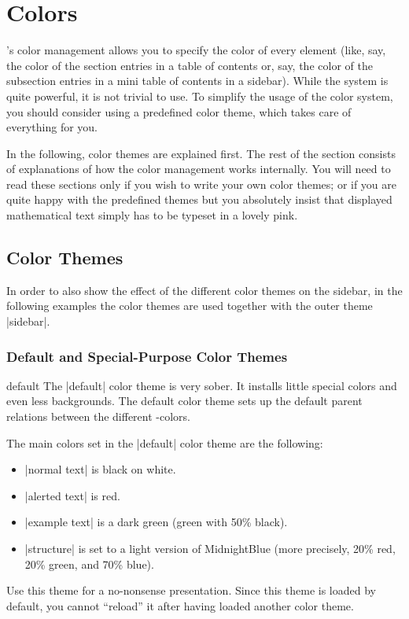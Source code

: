 %

\section{Colors}

\label{section-colors}

\beamer's color management allows you to specify the color of every
element (like, say, the color of the section entries in a table of
contents or, say, the color of the subsection entries in a mini table
of contents in a sidebar). While the system is quite powerful, it is
not trivial to use. To simplify the usage of the color system, you
should consider using a predefined color theme, which takes care of
everything for you.

In the following, color themes are explained first. The rest of the
section consists of explanations of how the color management works
internally. You will need to read these sections only if you wish to
write your own color themes; or if you are quite happy with the
predefined themes but you absolutely insist that displayed
mathematical text simply has to be typeset in a lovely pink.



\subsection{Color Themes}

In order to also show the effect of the different color themes on the
sidebar, in the following examples the color themes are used together
with the outer theme |sidebar|.

\subsubsection{Default and Special-Purpose Color Themes}

\begin{colorthemeexample}{default}
  The |default| color theme is very sober. It installs little special
  colors and even less backgrounds. The default color theme sets up
  the default parent relations between the different \beamer-colors.

  The main colors set in the |default| color theme are the following: 
  \begin{itemize}
  \item
    |normal text| is black on white.
  \item
    |alerted text| is red.
  \item
    |example text| is a dark green (green with 50\% black).
  \item
    |structure| is set to a light version of MidnightBlue
    (more precisely, 20\% red, 20\% green, and 70\% blue).  
  \end{itemize}
  Use this theme for a no-nonsense presentation. Since this theme is
  loaded by default, you cannot ``reload'' it after having loaded
  another color theme.
\end{colorthemeexample}

